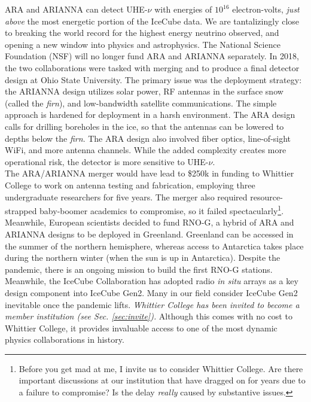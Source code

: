 \documentclass[../../../main.tex]{subfiles}
\begin{document}
ARA and ARIANNA can detect UHE-$\nu$ with energies of $10^{16}$ electron-volts, \textit{just above} the most energetic portion of the IceCube data.  We are tantalizingly close to breaking the world record for the highest energy neutrino observed, and opening a new window into physics and astrophysics.  The National Science Foundation (NSF) will no longer fund ARA and ARIANNA separately.  In 2018, the two collaborations were tasked with merging and to produce a final detector design at Ohio State University.  The primary issue was the deployment strategy: the ARIANNA design utilizes solar power, RF antennas in the surface snow (called the \textit{firn}), and low-bandwidth satellite communications.  The simple approach is hardened for deployment in a harsh environment.  The ARA design calls for drilling boreholes in the ice, so that the antennas can be lowered to depths below the \textit{firn}.  The ARA design also involved fiber optics, line-of-sight WiFi, and more antenna channels.  While the added complexity creates more operational risk, the detector is more sensitive to UHE-$\nu$.
\\
\vspace{0.15cm}
The ARA/ARIANNA merger would have lead to \$250k in funding to Whittier College to work on antenna testing and fabrication, employing three undergraduate researchers for five years.  The merger also required resource-strapped baby-boomer academics to compromise, so it failed spectacularly\footnote{Before you get mad at me, I invite us to consider Whittier College.  Are there important discussions at our institution that have dragged on for years due to a failure to compromise?  Is the delay \textit{really} caused by substantive issues.}.  Meanwhile, European scientists decided to fund RNO-G, a hybrid of ARA and ARIANNA designs to be deployed in Greenland.  Greenland can be accessed in the summer of the northern hemisphere, whereas access to Antarctica takes place during the northern winter (when the sun is up in Antarctica).  Despite the pandemic, there is an ongoing mission to build the first RNO-G stations.  Meanwhile, the IceCube Collaboration has adopted radio \textit{in situ} arrays as a key design component into IceCube Gen2.  Many in our field consider IceCube Gen2 inevitable once the pandemic lifts.  \textit{Whittier College has been invited to become a member institution (see Sec. \ref{sec:invite}).}  Although this comes with no cost to Whittier College, it provides invaluable access to one of the most dynamic physics collaborations in history.
\end{document}
